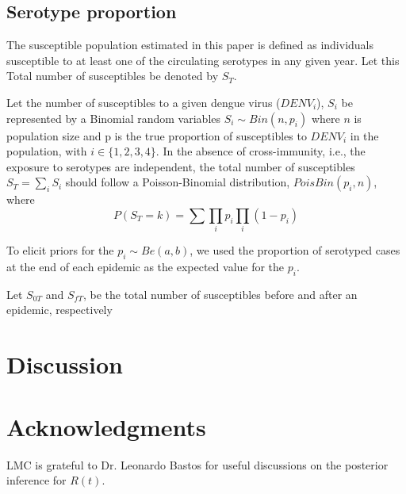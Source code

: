 \subsection*{Serotype proportion}
The susceptible population estimated in this paper is defined as individuals 
susceptible to at least one of the circulating serotypes in any given year. 
Let this Total number of susceptibles be denoted by $S_T$. 

Let the number of susceptibles to a given dengue virus ($DENV_i$), $S_i$ be 
represented by a Binomial random variables $S_i \sim Bin(n, p_i)$ where $n$ is 
population size and p is the true proportion of susceptibles to $DENV_i$ in 
the population, with $i \in  \{1, 2, 3, 4\}$. In the absence of 
cross-immunity, i.e., the exposure to serotypes are independent, the 
total number of susceptibles $S_T=\sum_i S_i$  should follow a Poisson-Binomial 
distribution, $PoisBin(p_i,n)$, where
\begin{equation}
 P(S_T=k) = \sum \prod_i p_i \prod_i  (1-p_i)
\end{equation}

To elicit priors for the $p_i \sim Be(a,b)$, we used the proportion of 
serotyped cases at the end of each epidemic as the expected value for the $p_i$.

Let $S_{0T}$ and $S_{fT}$, be the total number of susceptibles before and 
after an epidemic, respectively






\section*{Discussion}
\section*{Acknowledgments}
LMC is grateful to Dr. Leonardo Bastos for useful discussions on the 
posterior inference for $R(t)$.


